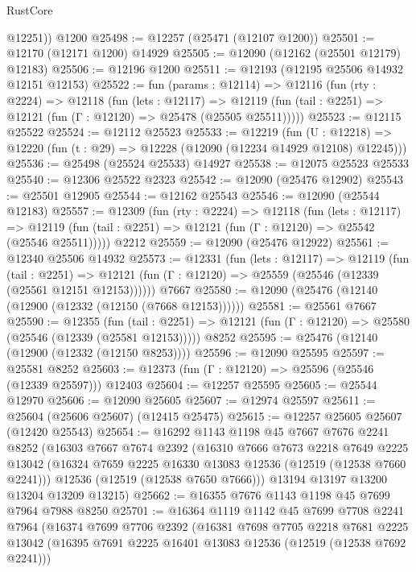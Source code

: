 \begin{lexlean}{RustCore}
\begin{coremodule}
        @12251))
    @1200
@25498 := @12257 (@25471 (@12107 @1200))
@25501 := @12170 (@12171 @1200) @14929
@25505 := @12090 (@12162 (@25501 @12179) @12183)
@25506 := @12196 @1200
@25511 := @12193 (@12195 @25506 @14932 @12151 @12153)
@25522 := fun (params : @12114) =>
  @12116
    (fun (rty : @2224) =>
    @12118
      (fun (lets : @12117) =>
      @12119 (fun (tail : @2251) => @12121 (fun (Γ : @12120) => @25478 (@25505 @25511)))))
@25523 := @12115 @25522
@25524 := @12112 @25523
@25533 := @12219
    (fun (U : @12218) => @12220 (fun (t : @29) => @12228 (@12090 (@12234 @14929 @12108) @12245)))
@25536 := @25498 (@25524 @25533) @14927
@25538 := @12075 @25523 @25533
@25540 := @12306 @25522 @2323
@25542 := @12090 (@25476 @12902)
@25543 := @25501 @12905
@25544 := @12162 @25543
@25546 := @12090 (@25544 @12183)
@25557 := @12309
    (fun (rty : @2224) =>
    @12118
      (fun (lets : @12117) =>
      @12119 (fun (tail : @2251) => @12121 (fun (Γ : @12120) => @25542 (@25546 @25511)))))
    @2212
@25559 := @12090 (@25476 @12922)
@25561 := @12340 @25506 @14932
@25573 := @12331
    (fun (lets : @12117) =>
    @12119
      (fun (tail : @2251) =>
      @12121 (fun (Γ : @12120) => @25559 (@25546 (@12339 (@25561 @12151 @12153))))))
    @7667
@25580 := @12090 (@25476 (@12140 (@12900 (@12332 (@12150 (@7668 @12153))))))
@25581 := @25561 @7667
@25590 := @12355
    (fun (tail : @2251) => @12121 (fun (Γ : @12120) => @25580 (@25546 (@12339 (@25581 @12153)))))
    @8252
@25595 := @25476 (@12140 (@12900 (@12332 (@12150 @8253))))
@25596 := @12090 @25595
@25597 := @25581 @8252
@25603 := @12373 (fun (Γ : @12120) => @25596 (@25546 (@12339 @25597))) @12403
@25604 := @12257 @25595
@25605 := @25544 @12970
@25606 := @12090 @25605
@25607 := @12974 @25597
@25611 := @25604 (@25606 @25607) (@12415 @25475)
@25615 := @12257 @25605 @25607 (@12420 @25543)
@25654 := @16292
    @1143
    @1198
    @45
    @7667
    @7676
    @2241
    @8252
    (@16303
      @7667
      @7674
      @2392
      (@16310
        @7666
        @7673
        @2218
        @7649
        @2225
        @13042
        (@16324 @7659 @2225 @16330 @13083 @12536 (@12519 (@12538 @7660 @2241)))
        @12536
        (@12519 (@12538 @7650 @7666)))
      @13194
      @13197
      @13200
      @13204
      @13209
      @13215)
@25662 := @16355 @7676 @1143 @1198 @45 @7699 @7964 @7988 @8250
@25701 := @16364
    @1119
    @1142
    @45
    @7699
    @7708
    @2241
    @7964
    (@16374
      @7699
      @7706
      @2392
      (@16381
        @7698
        @7705
        @2218
        @7681
        @2225
        @13042
        (@16395 @7691 @2225 @16401 @13083 @12536 (@12519 (@12538 @7692 @2241)))

\end{coremodule}
\end{lexlean}

